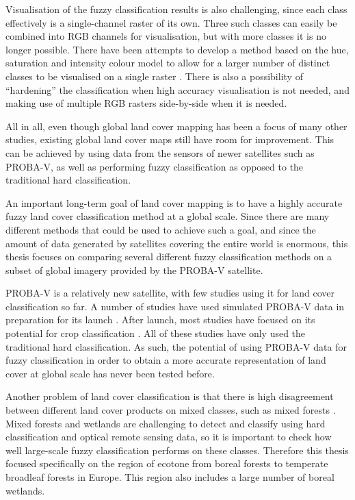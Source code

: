 \documentclass[a4paper,10pt]{article}
\begin{document}
Visualisation of the fuzzy classification results is also challenging, since each class effectively is a single-channel raster of its own. Three such classes can easily be combined into RGB channels for visualisation, but with more classes it is no longer possible. There have been attempts to develop a method based on the hue, saturation and intensity colour model to allow for a larger number of distinct classes to be visualised on a single raster \citep{hengl2004fuzzycmeans}. There is also a possibility of ``hardening'' the classification when high accuracy visualisation is not needed, and making use of multiple RGB rasters side-by-side when it is needed.

All in all, even though global land cover mapping has been a focus of many other studies, existing global land cover maps still have room for improvement. This can be achieved by using data from the sensors of newer satellites such as PROBA-V, as well as performing fuzzy classification as opposed to the traditional hard classification.

An important long-term goal of land cover mapping is to have a highly accurate fuzzy land cover classification method at a global scale. Since there are many different methods that could be used to achieve such a goal, and since the amount of data generated by satellites covering the entire world is enormous, this thesis focuses on comparing several different fuzzy classification methods on a subset of global imagery provided by the PROBA-V satellite.

PROBA-V is a relatively new satellite, with few studies using it for land cover classification so far. A number of studies have used simulated PROBA-V data in preparation for its launch \citep{stathakis2014probavurban,roumenina2013probavcrops,bartalev2014probavboreal}. After launch, most studies have focused on its potential for crop classification \citep{roumenina2015probavcrops,durgun2016crop,lambert2016cropland}. All of these studies have only used the traditional hard classification. As such, the potential of using PROBA-V data for fuzzy classification in order to obtain a more accurate representation of land cover at global scale has never been tested before.

Another problem of land cover classification is that there is high disagreement between different land cover products on mixed classes, such as mixed forests \citep{Herold2008lccomparison}. Mixed forests and wetlands are challenging to detect and classify using hard classification and optical remote sensing data, so it is important to check how well large-scale fuzzy classification performs on these classes. Therefore this thesis focused specifically on the region of ecotone from boreal forests to temperate broadleaf forests in Europe. This region also includes a large number of boreal wetlands. 
\end{document}
